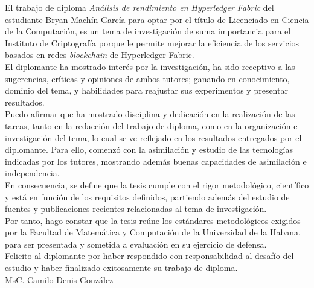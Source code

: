 \begin{opinion}
El trabajo de diploma \emph{An\'alisis de rendimiento en Hyperledger Fabric} del estudiante Bryan Mach\'in Garc\'ia para optar por el t\'itulo de Licenciado en Ciencia de la Computaci\'on, es un tema de investigaci\'on de suma importancia para el Instituto de Criptograf\'ia porque le permite mejorar la eficiencia de los servicios basados en redes \emph{blockchain} de Hyperledger Fabric.\\

El diplomante ha mostrado inter\'es por la investigaci\'on, ha sido receptivo a las sugerencias, cr\'iticas y opiniones de ambos tutores; ganando en conocimiento, dominio del tema, y habilidades para reajustar sus experimentos y presentar resultados.\\
 
Puedo afirmar que ha mostrado disciplina y dedicaci\'on en la realizaci\'on de las tareas, tanto en la redacci\'on del trabajo de diploma, como en la organizaci\'on e investigaci\'on del tema, lo cual se ve reflejado en los resultados entregados por el diplomante. Para ello, comenz\'o con la asimilaci\'on y estudio de las tecnolog\'ias indicadas por los tutores, mostrando adem\'as buenas capacidades de asimilaci\'on e independencia.\\

En consecuencia, se define que la tesis cumple con el rigor metodol\'ogico, cient\'ifico y est\'a en funci\'on de los requisitos definidos, partiendo adem\'as del estudio de fuentes y publicaciones recientes relacionadas al tema de investigaci\'on.\\

Por tanto, hago constar que la tesis re\'une los est\'andares metodol\'ogicos exigidos por la Facultad de Matem\'atica y Computaci\'on de la Universidad de la Habana, para ser presentada y sometida a evaluaci\'on en su ejercicio de defensa.\\

Felicito al diplomante por haber respondido con responsabilidad al desaf\'io del estudio y haber finalizado exitosamente su trabajo de diploma.\\

MsC. Camilo Denis González
\end{opinion}